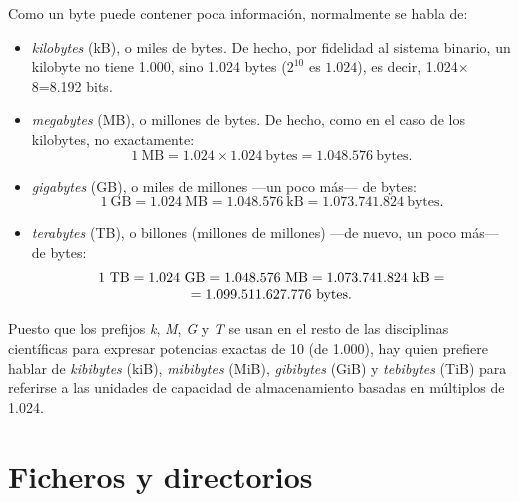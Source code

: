 Como un byte puede contener poca información, normalmente se habla de: \begin{itemize} \item \emph{kilobytes} (kB), o miles de bytes. De hecho, por fidelidad al sistema binario, un kilobyte no tiene 1.000, sino 1.024 bytes ($2^{10}$ es $1.024$), es decir, 1.024$\times$8=8.192 bits. \item \emph{megabytes} (MB), o millones de bytes. De hecho, como en el caso de los kilobytes, no exactamente: $$1~\mbox{MB} = 1.024 \times 1.024~\mbox{bytes}= 1.048.576~\mbox{bytes}.$$ \item \emph{gigabytes} (GB), o miles de millones ---un poco más--- de bytes: $$1~\mbox{GB}=1.024~\mbox{MB}=1.048.576~\mbox{kB}=1.073.741.824~\mbox{bytes}.$$ \item \emph{terabytes} (TB), o billones (millones de millones) ---de nuevo, un poco más--- de bytes: \[ \begin{array}{c} $$1~\mbox{TB}=1.024~\mbox{GB}=1.048.576~\mbox{MB}=1.073.741.824~\mbox{kB}=\\ =1.099.511.627.776~\mbox{bytes}.$$ \end{array} \] \end{itemize} Puesto que los prefijos \emph{k}, \emph{M}, \emph{G} y \emph{T} se usan en el resto de las disciplinas científicas para expresar potencias exactas de 10 (de 1.000), hay quien prefiere hablar de \emph{kibibytes} (kiB), \emph{mibibytes} (MiB), \emph{gibibytes} (GiB) y \emph{tebibytes} (TiB) para referirse a las unidades de capacidad de almacenamiento basadas en múltiplos de 1.024. 

\section{Ficheros y directorios} \label{se:fitxers} \label{pg:fitxer} 

